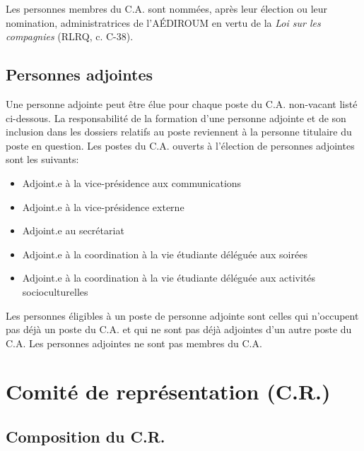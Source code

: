 \documentclass{aediroum}
\begin{document}
Les personnes membres du C.A. sont nommées, après leur élection ou leur nomination, administratrices de l'AÉDIROUM en vertu de la \textit{Loi sur les compagnies} (RLRQ, c. C-38).

\subsection{Personnes adjointes}\label{sec:adjoints}

Une personne adjointe peut être élue pour chaque poste du C.A. non-vacant listé ci-dessous.
La responsabilité de la formation d’une personne adjointe et de son inclusion
dans les dossiers relatifs au poste reviennent à la personne titulaire du poste en question.
Les postes du C.A. ouverts à l’élection de personnes adjointes sont les suivants:
\begin{itemize}
\item Adjoint.e à la vice-présidence aux communications
\item Adjoint.e à la vice-présidence externe
\item Adjoint.e au secrétariat
\item Adjoint.e à la coordination à la vie étudiante déléguée aux soirées
\item Adjoint.e à la coordination à la vie étudiante déléguée aux activités socioculturelles
\end{itemize}
Les personnes éligibles à un poste de personne adjointe sont celles qui n’occupent pas
déjà un poste du C.A. et qui ne sont pas déjà adjointes d’un autre poste du C.A. Les
personnes adjointes ne sont pas membres du C.A.

\section{Comité de représentation (C.R.)}
\subsection{Composition du C.R.}
\label{sec:composition-du-conseil-dadministration}
\end{document}

